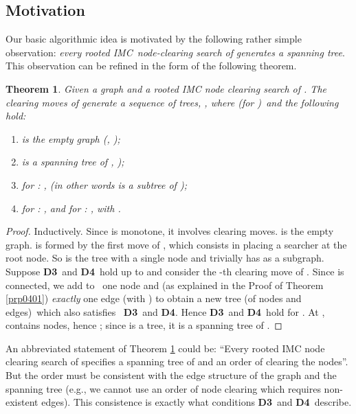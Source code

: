 \documentclass[11pt]{article}\usepackage{amsmath}
\newtheorem{theorem}{Theorem}[section]
\begin{document}
\subsection{Motivation}

\label{sec0501}

Our basic algorithmic idea is motivated by the following rather simple
observation: \emph{every rooted IMC\ node-clearing search of }\emph{ generates a spanning tree}. This observation can be refined in the
form of the following theorem.

\begin{theorem}
\label{prp0501}Given a graph  and a rooted
IMC node clearing search  of . The clearing moves of
 generate a sequence of trees, , where (for
)\  and the
following hold:\ 

\begin{enumerate}
\item[\textbf{D1}]  is the empty graph (,
);

\item[\textbf{D2}]  is a spanning tree of , );

\item[\textbf{D3}] for : ,  (in other words  is a subtree of
);

\item[\textbf{D4}] for : , and for : , with .
\end{enumerate}
\end{theorem}

\begin{proof}
Inductively. Since  is monotone, it involves  clearing moves.
 is the empty graph.  is formed by the first
move of , which consists in placing a searcher at the root node.
So  is the tree with a single node and trivially has
as a subgraph. Suppose \textbf{D3}\ and \textbf{D4}\ hold up
to  and consider the -th clearing move of
. Since  is connected, we add to \ one
node  and (as explained in the Proof of Theorem \ref{prp0401})
\emph{exactly }one edge  (with ) to
obtain a new tree  (of  nodes and  edges)\ which
also satisfies \ \textbf{D3}\ and \textbf{D4}. Hence \textbf{D3}\ and
\textbf{D4}\ hold for . At ,  contains  nodes,
hence ; since  is a tree, it is a spanning tree of
.
\end{proof}

\begin{remark}
\label{prp0502}An abbreviated statement of Theorem \ref{prp0501} could be:
\textquotedblleft Every rooted IMC node clearing search of 
specifies a spanning tree of \textbf{ }and an order of clearing
the nodes\textquotedblright. But the order must be consistent with the edge
structure of the graph and the spanning tree (e.g., we cannot use an order of
node clearing which requires non-existent edges). This consistence is exactly
what conditions \textbf{D3}\ and \textbf{D4}\ describe.
\end{remark}
\end{document}
